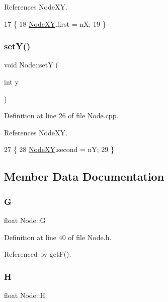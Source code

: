 References Node\+XY.


\begin{DoxyCode}
17 \{
18     \hyperlink{class_node_ac85b927d8c9cdc484f169129d317f6f0}{NodeXY}.first = nX;
19 \}
\end{DoxyCode}
\mbox{\label{class_node_a2655bd886609cf39f486130733124ec7}} 
\subsubsection{\texorpdfstring{set\+Y()}{setY()}}
{\footnotesize\ttfamily void Node\+::setY (\begin{DoxyParamCaption}\item[{int}]{y }\end{DoxyParamCaption})}



Definition at line 26 of file Node.\+cpp.



References Node\+XY.


\begin{DoxyCode}
27 \{
28     \hyperlink{class_node_ac85b927d8c9cdc484f169129d317f6f0}{NodeXY}.second = nY;
29 \}
\end{DoxyCode}


\subsection{Member Data Documentation}
\mbox{\label{class_node_a3c6a67023068f762eaaa8a4861ab3e9f}} 
\subsubsection{\texorpdfstring{G}{G}}
{\footnotesize\ttfamily float Node\+::G\hspace{0.3cm}{\ttfamily [private]}}



Definition at line 40 of file Node.\+h.



Referenced by get\+F().

\mbox{\label{class_node_a26426055f336a81dc05680b981e4c270}} 
\subsubsection{\texorpdfstring{H}{H}}
{\footnotesize\ttfamily float Node\+::H\hspace{0.3cm}{\ttfamily [private]}}



